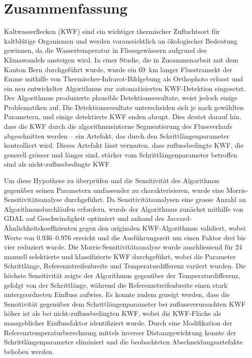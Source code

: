 \documentclass[english,11pt,a4paper,oneside]{report}
\begin{document}
	\newpage
	
	\section*{Zusammenfassung}
	
	Kaltwasserflecken (KWF) sind ein wichtiger thermischer Zufluchtsort für 
	kaltblütige Organismen und werden voraussichtlich an ökologischer Bedeutung 
	gewinnen, da die Wassertemperatur in Fliessgewässern aufgrund des Klimawandels 
	ansteigen wird. In einer Studie, die in Zusammenarbeit mit dem Kanton Bern 
	durchgeführt wurde, wurde ein 69~km langer Flusstransekt der Emme mithilfe 
	von Thermischer-Infrarot-Bildgebung als Orthophoto erfasst und ein neu 
	entwickelter Algorithmus zur automatisierten KWF-Detektion eingesetzt. Der 
	Algorithmus produzierte plausible Detektionsresultate, weist jedoch einige 
	Problematiken auf. Die Detektionsresultate unterscheiden sich je nach 
	gewählten Parametern, und einige detektierte KWF enden abrupt. Dies deutet 
	darauf hin, dass die KWF durch die algorithmusinterne Segmentierung des 
	Flussverlaufs abgeschnitten werden -- ein Artefakt, das durch den 
	Schrittlängenparameter kontrolliert wird. Dieses Artefakt lässt vermuten, 
	dass zuflussbedingte KWF, die generell grösser und länger sind, stärker vom 
	Schrittlängenparameter betroffen sind als nicht-zuflussbedingte KWF.
	
	Um diese Hypothese zu überprüfen und die Sensitivität des Algorithmus 
	gegenüber seinen Parametern umfassender zu charakterisieren, wurde eine 
	Morris-Sensitivitätsanalyse durchgeführt. Da Sensitivitätsanalysen eine 
	grosse Anzahl an Algorithmusdurchläufen erfordern, wurde der Algorithmus 
	zunächst mithilfe von GDAL auf Geschwindigkeit optimiert und anhand des 
	Jaccard-Ähnlichkeitskoeffizienten gegen den originalen KWF-Algorithmus 
	validiert, wobei Werte von 0.936--0.976 erreicht und die Ausführungszeit 
	um einen Faktor drei bis vier reduziert wurde. Die Morris-Sensitivitätsanalyse 
	wurde anschliessend für 24 manuell selektierte und klassifizierte KWF 
	durchgeführt, wobei die Parameter Schrittlänge, Referenzstreifenbreite und 
	Temperaturdifferenz variiert wurden. Die höchste Sensitivität zeigte der 
	Algorithmus gegenüber der Temperaturdifferenz, gefolgt von der Schrittlänge, 
	während die Referenzstreifenbreite einen stark untergeordneten Einfluss 
	aufwies. Es konnte zudem gezeigt werden, dass die Sensitivität gegenüber dem 
	Schrittlängenparameter bei zuflussverursachten KWF höher ist als bei 
	nicht-zuflussbedingten KWF, wobei die KWF-Fläche als massgeblicher 
	Einflussfaktor identifiziert wurde. Durch eine Modifikation der 
	Referenztemperaturberechnung mittels inverser Distanzgewichtung konnte der 
	Schrittlängenparameter eliminiert und die beobachteten 
	Abschneidungsartefakte behoben werden.
	
\end{document}
